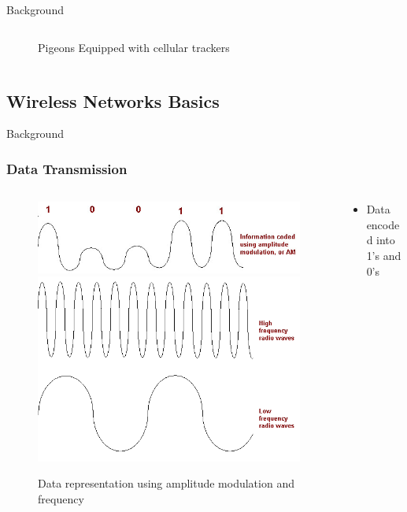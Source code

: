 \documentclass{beamer}
\begin{document}
\begin{frame}{Background}
\begin{columns}
\begin{column}{.5\textwidth}
\begin{figure}[htbp]
          \caption{Pigeons Equipped with cellular trackers \cite{Martin_2006}}
          \label{fig:PigeonCellular}
        \end{figure}
      \end{column}
    \end{columns}
\end{frame}

\subsection{Wireless Networks Basics}

\begin{frame}{Background}
  \frametitle{Data Transmission}
  \begin{columns}
    \begin{column}{0.4\textwidth}
        \begin{figure}[htbp]
          \centering
          \includegraphics[width=\textwidth]{AMdataTransmission.jpg}
          \includegraphics[width=.8\textwidth]{Frequency_graph.png}
          \caption{Data representation using amplitude modulation and frequency \cite{AMdata}}
          \label{fig:AM_data_transmission}
        \end{figure}
    \end{column}
    \begin{column}{0.6\textwidth}
      \begin{itemize}
        \item Data encoded into 1's and 0's

\end{itemize}
\end{column}
\end{columns}
\end{frame}
\end{document}
